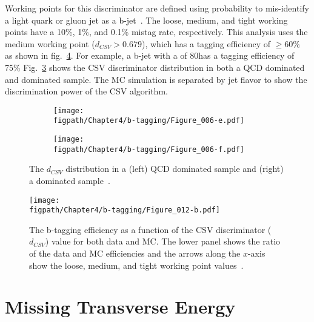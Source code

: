 Working points for this discriminator are defined using probability to mis-identify a light quark or gluon jet as a b-jet~\cite{CMS-PAS-BTV-13-001}.
The loose, medium, and tight working points have a 10\%, 1\%, and 0.1\% mistag rate, respectively. 
This analysis uses the medium working point ($d_{CSV}>0.679$), which has a tagging efficiency of $\geq60\%$ as shown in fig.~\ref{fig:bDiscriminator_efficiency}.
For example, a b-jet with a \pt of 80\gev has a tagging efficiency of 75\%
Fig.~\ref{fig:bDiscriminator} shows the CSV discriminator distribution in both a QCD dominated and \ttbar dominated sample.
The MC simulation is separated by jet flavor to show the discrimination power of the CSV algorithm.
\begin{figure}[!hbt]
    \centering
    \begin{subfigure}[t]{0.48\textwidth}
        \texttt{[image: \\figpath/Chapter4/b-tagging/Figure\_006-e.pdf]}
        \caption{}
        \label{fig:bDiscriminator_QCD}
    \end{subfigure}
    \begin{subfigure}[t]{0.48\textwidth}
        \texttt{[image: \\figpath/Chapter4/b-tagging/Figure\_006-f.pdf]}
        \caption{}
        \label{fig:bDiscriminator_ttbar}
    \end{subfigure}
    \caption{The $d_{CSV}$ distribution in a (left) QCD dominated sample and (right) a \ttbar dominated sample~\cite{CMS-PAS-BTV-13-001}.}
    \label{fig:bDiscriminator}
\end{figure}

\begin{figure}[!hbt]
    \centering
    \texttt{[image: \\figpath/Chapter4/b-tagging/Figure\_012-b.pdf]}
    \caption{The b-tagging efficiency as a function of the CSV discriminator ($d_{CSV}$) value for both data and MC. The lower panel shows the ratio of the data and MC efficiencies and the arrows along the $x$-axis show the loose, medium, and tight working point values~\cite{CMS-PAS-BTV-13-001}.}
    \label{fig:bDiscriminator_efficiency}
\end{figure}

\section{Missing Transverse Energy}
\label{sec:MET}

